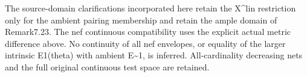\documentclass[
]{article}
\begin{document}
The source-domain clarifications incorporated here retain the X\^{}lin
restriction only for the ambient pairing membership and retain the ample
domain of Remark7.23. The nef continuous compatibility uses the explicit
actual metric difference above. No continuity of all nef envelopes, or
equality of the larger intrinsic E1(theta) with ambient
E\textasciitilde1, is inferred. All-cardinality decreasing nets and the
full original continuous test space are retained.
\end{document}
